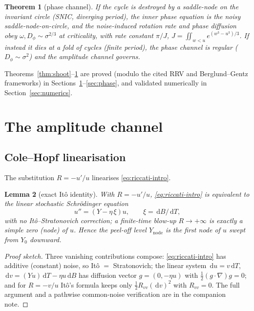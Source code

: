 \documentclass[11pt,reqno]{amsart}
\theoremstyle{plain}
\newtheorem{theorem}{Theorem}
\newtheorem{lemma}[theorem]{Lemma}
\theoremstyle{definition}
\theoremstyle{remark}
\newcommand{\dd}{\,\mathrm{d}}
\newcommand{\Ynode}{Y_{\mathrm{node}}}
\begin{document}
\begin{theorem}[phase channel]\label{thm:phase}
If the cycle is destroyed by a saddle-node on the invariant circle (SNIC, diverging
period), the inner phase equation is the noisy saddle-node-on-circle, and the
noise-induced rotation rate and phase diffusion obey
$\omega,D_\phi\sim\sigma^{2/3}$ at criticality, with rate constant $\pi/J$,
$J=\iint_{w<u}e^{(w^3-u^3)/3}$. If instead it dies at a fold of cycles (finite period), the
phase channel is regular ($D_\phi\sim\sigma^2$) and the amplitude channel governs.
\end{theorem}

Theorems~\ref{thm:shoot}--\ref{thm:phase} are proved (modulo the cited RRV and
Berglund--Gentz frameworks) in Sections~\ref{sec:amplitude}--\ref{sec:phase}, and validated
numerically in Section~\ref{sec:numerics}.

\section{The amplitude channel}\label{sec:amplitude}

\subsection{Cole--Hopf linearisation}
The substitution $R=-u'/u$ linearises \eqref{eq:riccati-intro}.

\begin{lemma}[exact It\^o identity]\label{lem:colehopf}
With $R=-u'/u$, \eqref{eq:riccati-intro} is equivalent to the linear stochastic
Schr\"odinger equation
\begin{equation}\label{eq:colehopf}
  u''=(Y-\eta\,\xi)u,\qquad \xi=\dd B/\dd T,
\end{equation}
with no It\^o--Stratonovich correction; a finite-time blow-up $R\to+\infty$ is exactly a
simple zero (node) of $u$. Hence the peel-off level $\Ynode$ is the first node of $u$ swept
from $Y_0$ downward.
\end{lemma}

\begin{proof}[Proof sketch]
Three vanishing contributions compose: \eqref{eq:riccati-intro} has additive (constant)
noise, so It\^o $=$ Stratonovich; the linear system $\dd u=v\dd T$, $\dd v=(Yu)\dd T-\eta
u\dd B$ has diffusion vector $g=(0,-\eta u)$ with $\tfrac12(g\cdot\nabla)g=0$; and for
$R=-v/u$ It\^o's formula keeps only $\tfrac12 R_{vv}(\dd v)^2$ with $R_{vv}=0$. The full
argument and a pathwise common-noise verification are in the companion note.
\end{proof}
\end{document}
